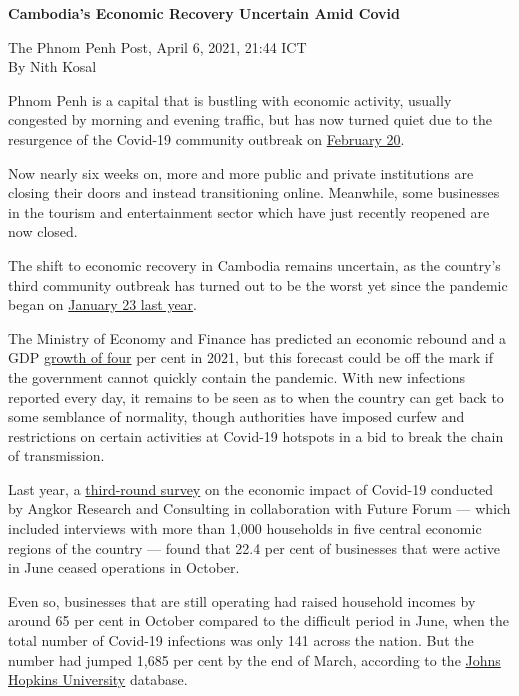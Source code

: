 \documentclass[10pt,a4paper]{letter}
\begin{document}
	
{\Large 
	\textbf{Cambodia's Economic Recovery Uncertain Amid Covid}
} 

The Phnom Penh Post, April 6, 2021, 21:44 ICT \\
By Nith Kosal

Phnom Penh is a capital that is bustling with economic activity, usually congested by morning and evening traffic, but has now turned quiet due to the resurgence of the Covid-19 community outbreak on \href{https://www.channelnewsasia.com/news/asia/cambodia-covid-19-outbreak-chinese-expat-community-china-hun-sen-14242700}{February 20}.

Now nearly six weeks on, more and more public and private institutions are closing their doors and instead transitioning online. Meanwhile, some businesses in the tourism and entertainment sector which have just recently reopened are now closed.

The shift to economic recovery in Cambodia remains uncertain, as the country's third community outbreak has turned out to be the worst yet since the pandemic began on \href{https://www.nytimes.com/2021/02/16/health/coronavirus-pandemic-cambodia-manning.html?referringSource=articleShare}{January 23 last year}.

The Ministry of Economy and Finance has predicted an economic rebound and a GDP \href{https://www.khmertimeskh.com/50826489/mixed-outlook-on-the-economy/}{growth of four} per cent in 2021, but this forecast could be off the mark if the government cannot quickly contain the pandemic. With new infections reported every day, it remains to be seen as to when the country can get back to some semblance of normality, though authorities have imposed curfew and restrictions on certain activities at Covid-19 hotspots in a bid to break the chain of transmission.

Last year, a \href{http://www.angkorresearch.com/imgs/file/The%20Effect%20of%20Covid-19%20Impacts%20on%20Cambodian%20Development_%20Headline%20Results%20Brief_R3_EN_V4.pdf}{third-round survey} on the economic impact of Covid-19 conducted by Angkor Research and Consulting in collaboration with Future Forum --- which included interviews with more than 1,000 households in five central economic regions of the country --- found that 22.4 per cent of businesses that were active in June ceased operations in October.

Even so, businesses that are still operating had raised household incomes by around 65 per cent in October compared to the difficult period in June, when the total number of Covid-19 infections was only 141 across the nation. But the number had jumped 1,685 per cent by the end of March, according to the \href{https://github.com/CSSEGISandData/COVID-19}{Johns Hopkins University} database.
\end{document}

